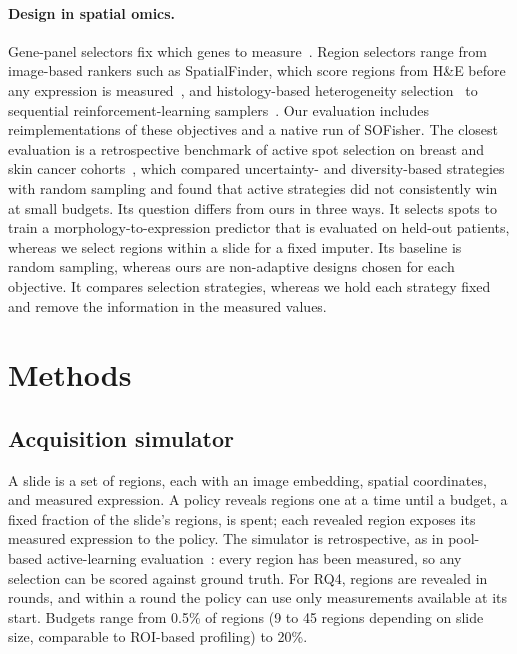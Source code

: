 \documentclass[10pt]{article}
\begin{document}
\paragraph{Design in spatial omics.} Gene-panel selectors fix which genes to
measure~\citep{covert2023persist,reconst2026}. Region selectors range from image-based rankers such as SpatialFinder,
which score regions from H\&E before any expression is measured~\citep{spatialfinder2026}, and histology-based heterogeneity
selection~\citep{yuan2025s2omics} to
sequential reinforcement-learning samplers~\citep{li2026sofisher,zhu2026scr2st}. Our evaluation includes
reimplementations of these objectives and a native run of SOFisher. The closest evaluation is a retrospective
benchmark of active spot selection on breast and skin cancer cohorts~\citep{zhu2026benchmarking}, which compared
uncertainty- and diversity-based strategies with random sampling and found that active strategies did not
consistently win at small budgets. Its question differs from ours in three ways. It selects spots to train a
morphology-to-expression predictor that is evaluated on held-out patients, whereas we select regions within a
slide for a fixed imputer. Its baseline is random sampling, whereas ours are non-adaptive designs chosen for each
objective. It compares selection strategies, whereas we hold each strategy fixed and remove the information in the
measured values.

\section{Methods}
\label{sec:methods}

\subsection{Acquisition simulator}
A slide is a set of regions, each with an image embedding, spatial coordinates, and measured expression. A
policy reveals regions one at a time until a budget, a fixed fraction of the slide's regions, is spent; each
revealed region exposes its measured expression to the policy. The simulator is retrospective, as in pool-based
active-learning evaluation~\citep{settles2009active}: every region has been measured, so any selection can be
scored against ground truth. For RQ4, regions are revealed in rounds, and within a round the policy can use only
measurements available at its start. Budgets range from 0.5\% of regions (9 to 45 regions depending on slide
size, comparable to ROI-based profiling) to 20\%.
\end{document}
